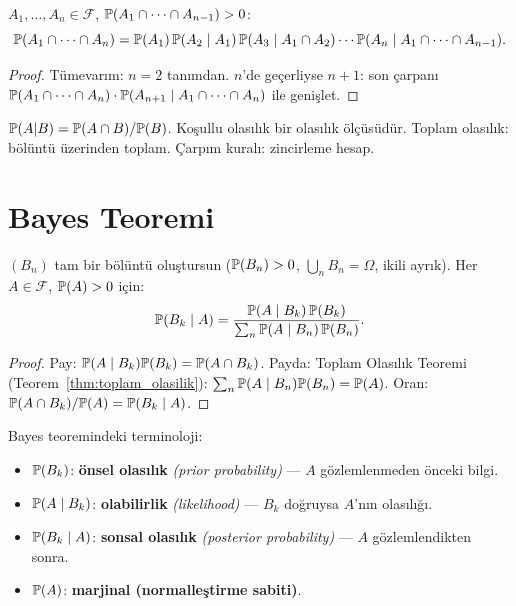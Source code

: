 \begin{teorem}\label{thm:carpim}
$A_1, \ldots, A_n \in \mathcal{F}$, $\mathbb{P}(A_1 \cap \cdots \cap A_{n-1}) > 0$:
\[
  \mathbb{P}(A_1 \cap \cdots \cap A_n)
  = \mathbb{P}(A_1)\,\mathbb{P}(A_2 \mid A_1)\,\mathbb{P}(A_3 \mid A_1 \cap A_2)
    \cdots \mathbb{P}(A_n \mid A_1 \cap \cdots \cap A_{n-1}).
\]
\end{teorem}

\begin{proof}
Tümevarım: $n=2$ tanımdan. $n$'de geçerliyse $n+1$:
son çarpanı $\mathbb{P}(A_1 \cap \cdots \cap A_n) \cdot \mathbb{P}(A_{n+1} \mid A_1 \cap \cdots \cap A_n)$
ile genişlet.
\end{proof}

\begin{mikroozet}[§2.3 özeti]
$\mathbb{P}(A|B) = \mathbb{P}(A \cap B)/\mathbb{P}(B)$. Koşullu olasılık bir olasılık ölçüsüdür.
Toplam olasılık: bölüntü üzerinden toplam. Çarpım kuralı: zincirleme hesap.
\end{mikroozet}


\section{Bayes Teoremi}

\begin{teorem}\label{thm:bayes}
$(B_n)$ tam bir bölüntü oluştursun ($\mathbb{P}(B_n)>0$, $\bigcup_n B_n = \Omega$,
ikili ayrık). Her $A \in \mathcal{F}$, $\mathbb{P}(A)>0$ için:
\[
  \mathbb{P}(B_k \mid A)
  = \frac{\mathbb{P}(A \mid B_k)\,\mathbb{P}(B_k)}{\sum_n \mathbb{P}(A \mid B_n)\,\mathbb{P}(B_n)}.
\]
\end{teorem}

\begin{proof}
Pay: $\mathbb{P}(A \mid B_k)\mathbb{P}(B_k) = \mathbb{P}(A \cap B_k)$.
Payda: Toplam Olasılık Teoremi (Teorem~\ref{thm:toplam_olasilik}):
$\sum_n \mathbb{P}(A \mid B_n)\mathbb{P}(B_n) = \mathbb{P}(A)$.
Oran: $\mathbb{P}(A \cap B_k)/\mathbb{P}(A) = \mathbb{P}(B_k \mid A)$.
\end{proof}

\begin{notkutu}
Bayes teoremindeki terminoloji:
\begin{itemize}
  \item $\mathbb{P}(B_k)$: \textbf{önsel olasılık} \emph{(prior probability)} --- $A$ gözlemlenmeden önceki bilgi.
  \item $\mathbb{P}(A \mid B_k)$: \textbf{olabilirlik} \emph{(likelihood)} --- $B_k$ doğruysa $A$'nın olasılığı.
  \item $\mathbb{P}(B_k \mid A)$: \textbf{sonsal olasılık} \emph{(posterior probability)} --- $A$ gözlemlendikten sonra.
  \item $\mathbb{P}(A)$: \textbf{marjinal (normalleştirme sabiti)}.
\end{itemize}
\end{notkutu}

